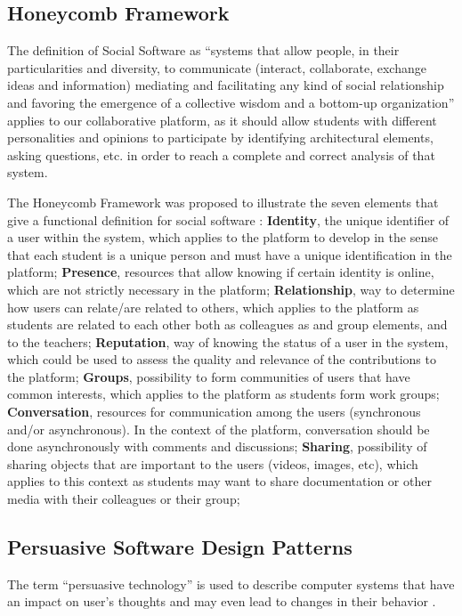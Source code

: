 \documentclass[conference]{IEEEtran}
\begin{document}
\subsection{Honeycomb Framework}
\label{relatedWorkHoneycomb}
The definition of Social Software as ``systems that allow people, in their particularities and diversity, to communicate (interact, collaborate, exchange ideas and information) mediating and facilitating any kind of social relationship and favoring the emergence of a collective wisdom and a bottom-up organization'' \cite{pereira2010social} applies to our collaborative platform, as it should allow students with different personalities and opinions to participate by identifying architectural elements, asking questions, etc. in order to reach a complete and correct analysis of that system. 

The Honeycomb Framework was proposed to illustrate the seven elements that give a functional definition for social software \cite{smith2007social}: \textbf{Identity}, the unique identifier of a user within the system, which applies to the platform to develop in the sense that each student is a unique person and must have a unique identification in the platform; \textbf{Presence}, resources that allow knowing if certain identity is online, which are not strictly necessary in the platform; \textbf{Relationship}, way to determine how users can relate/are related to others, which applies to the platform as students are related to each other both as colleagues as and group elements, and to the teachers; \textbf{Reputation}, way of knowing the status of a user in the system, which could be used to assess the quality and relevance of the contributions to the platform; \textbf{Groups}, possibility to form communities of users that have common interests, which applies to the platform as students form work groups; \textbf{Conversation}, resources for communication among the users (synchronous and/or asynchronous). In the context of the platform, conversation should be done asynchronously with comments and discussions; \textbf{Sharing}, possibility of sharing objects that are important to the users (videos, images, etc), which applies to this context as students may want to share documentation or other media with their colleagues or their group;

\subsection{Persuasive Software Design Patterns}
\label{relatedWorkPersuasive}
The term ``persuasive technology'' is used to describe computer systems that have an impact on user's thoughts and may even lead to changes in their behavior \cite{fogg2002persuasive,oinas2009persuasive}.
\end{document}
